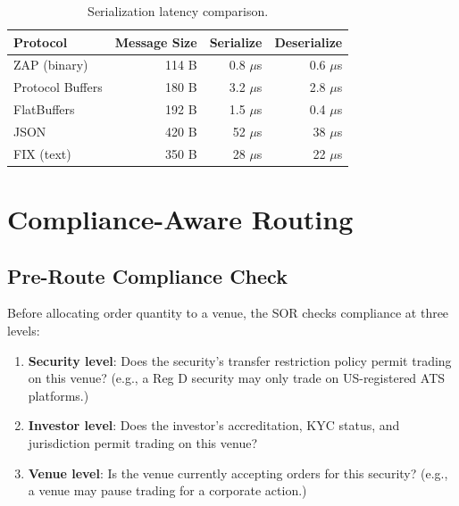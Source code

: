 \documentclass[11pt,a4paper]{article}
\begin{document}
\begin{table}[H]
\centering
\caption{Serialization latency comparison.}
\label{tab:latency}
\begin{tabular}{lrrr}
\toprule
\textbf{Protocol} & \textbf{Message Size} & \textbf{Serialize} & \textbf{Deserialize} \\
\midrule
ZAP (binary) & 114 B & 0.8 $\mu$s & 0.6 $\mu$s \\
Protocol Buffers & 180 B & 3.2 $\mu$s & 2.8 $\mu$s \\
FlatBuffers & 192 B & 1.5 $\mu$s & 0.4 $\mu$s \\
JSON & 420 B & 52 $\mu$s & 38 $\mu$s \\
FIX (text) & 350 B & 28 $\mu$s & 22 $\mu$s \\
\bottomrule
\end{tabular}
\end{table}

\section{Compliance-Aware Routing}\label{sec:compliance}

\subsection{Pre-Route Compliance Check}

Before allocating order quantity to a venue, the SOR checks compliance at three levels:

\begin{enumerate}[nosep]
  \item \textbf{Security level}: Does the security's transfer restriction policy permit trading on this venue? (e.g., a Reg D security may only trade on US-registered ATS platforms.)
  \item \textbf{Investor level}: Does the investor's accreditation, KYC status, and jurisdiction permit trading on this venue?
  \item \textbf{Venue level}: Is the venue currently accepting orders for this security? (e.g., a venue may pause trading for a corporate action.)
\end{enumerate}
\end{document}
